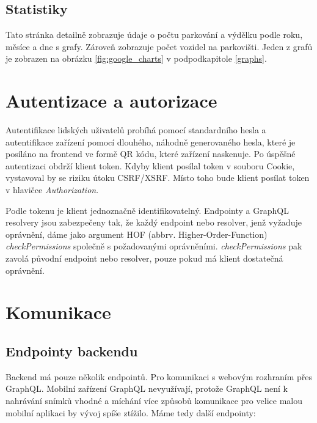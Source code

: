 \subsection{Statistiky}

\noindent
Tato stránka detailně zobrazuje údaje o počtu parkování a výdělku podle roku, měsíce a dne s grafy.
Zároveň zobrazuje počet vozidel na parkovišti.
Jeden z grafů je zobrazen na obrázku \ref{fig:google_charts} v podpodkapitole \ref{graphs}.

\section{Autentizace a autorizace} \label{auther_authen}

\noindent
Autentifikace lidských uživatelů probíhá pomocí standardního hesla a autentifikace zařízení pomocí dlouhého,
náhodně generovaného hesla,
které je posíláno na frontend ve formě QR kódu, které zařízení naskenuje.
Po úspěšné autentizaci obdrží klient token.
Kdyby klient posílal token v souboru Cookie, vystavoval by se riziku útoku CSRF/XSRF.
Místo toho bude klient posílat token v hlavičce \textit{Authorization}.

Podle tokenu je klient jednoznačně identifikovatelný. Endpointy a GraphQL resolvery jsou zabezpečeny tak,
že každý endpoint nebo resolver, jenž vyžaduje oprávnění, dáme jako argument HOF (abbrv. Higher-Order-Function)
\textit{checkPermissions} společně s požadovanými oprávněními. \textit{checkPermissions} pak zavolá původní
endpoint nebo resolver, pouze pokud má klient dostatečná oprávnění.

\section{Komunikace}

\subsection{Endpointy backendu} \label{endpoints}

\noindent
Backend má pouze několik endpointů. Pro komunikaci s webovým rozhraním přes GraphQL.
Mobilní zařízení GraphQL nevyužívají, protože GraphQL není k nahrávání snímků vhodné a míchání více způsobů
komunikace pro velice malou mobilní aplikaci by vývoj spíše ztížilo. Máme tedy další endpointy:

